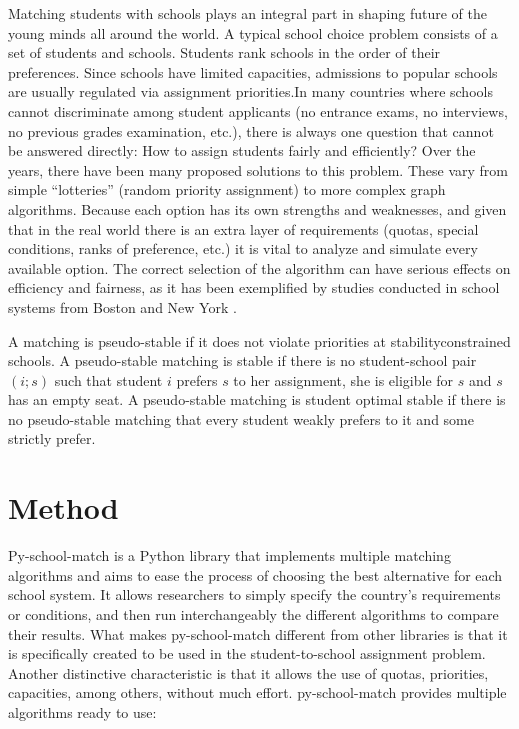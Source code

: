 \documentclass[twocolumn]{bmcart}
\begin{document}
	Matching students with schools plays an integral part in shaping future of the young minds all around the world. A typical school choice problem consists of a set of students and schools. Students rank schools in the order of their preferences. Since schools have
	limited capacities, admissions to popular schools are usually regulated via assignment priorities.In many countries where schools cannot discriminate among student applicants (no entrance exams, no interviews, no previous grades examination, etc.), there is always one question that cannot be answered directly: How to assign students fairly and efficiently?
	\vspace{\baselineskip}
	Over the years, there have been many proposed solutions to this problem. These vary from simple “lotteries” (random priority assignment) to more complex graph algorithms. Because each option has its own strengths and weaknesses, and given that in the real world there is an extra layer of requirements (quotas, special conditions, ranks of preference, etc.) it is vital to analyze and simulate every available option. The correct selection of the algorithm can have serious effects on efficiency and fairness, as it has been exemplified by studies conducted in school systems from Boston \cite{sub1} and New York \cite{sub2}.
	
	A matching is pseudo-stable if it does not violate priorities at stabilityconstrained schools. A pseudo-stable matching is stable if there is no student-school pair $(i; s)$ such that student $i$ prefers $s$ to her assignment, she is eligible for $s$ and $s$ has an empty seat. A pseudo-stable matching is student optimal stable if there is no pseudo-stable matching that every student weakly
	prefers to it and some strictly prefer.
		
	
	\section*{Method}
	\vspace{\baselineskip}
	Py-school-match \cite{article} is a Python library that implements multiple matching algorithms and aims to ease the process of choosing the best alternative for each school system. It allows researchers to simply specify the country’s requirements or conditions, and then run interchangeably the different algorithms to compare their results. What makes py-school-match different from other libraries is that it is specifically created to be used in the student-to-school assignment problem. Another distinctive characteristic is that it allows the use of quotas, priorities, capacities, among others, without much effort. \vspace{\baselineskip}
	py-school-match provides multiple algorithms ready to use:
	\vspace{\baselineskip}
	
\end{document}
